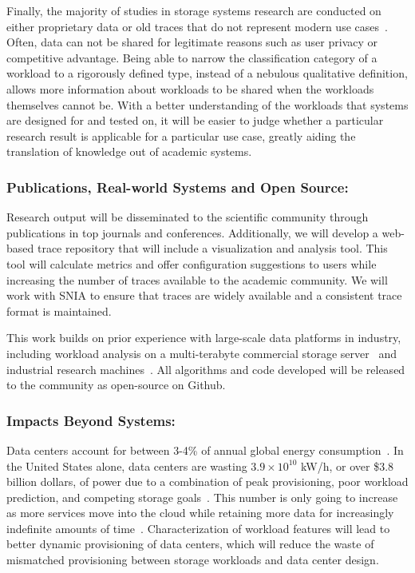 Finally, the majority of studies in storage systems research are conducted on
either proprietary data or old traces that do not represent modern use
cases~\cite{avani-systor}.  Often, data can not be shared for legitimate reasons such as
user privacy or competitive advantage.  Being able to narrow the classification
category of a workload to a rigorously defined type, instead of a nebulous
qualitative definition, allows more information about workloads to be shared
when the workloads themselves cannot be.
With a better understanding of the workloads that systems are designed for and
tested on, it will be easier to judge whether a particular research result is
applicable for a particular use case, greatly aiding the translation of
knowledge out of academic systems.

\subsubsection*{Publications, Real-world Systems and Open Source: } 

Research output will be disseminated to the scientific community through
publications in top journals and conferences.  Additionally, we will develop a
web-based trace repository that will include a visualization and analysis tool. This tool will calculate metrics and
offer configuration suggestions to users while increasing the number
of traces available to the academic community.  We will work with SNIA to ensure that traces are widely available and a consistent trace format is maintained.

This work builds on prior experience with large-scale data platforms in industry, including workload
analysis on a multi-terabyte commercial storage server~\cite{hands} and
industrial research machines~\cite{avani-systor}.
All algorithms and code developed will be released to the community as
open-source on Github.%

\subsubsection*{Impacts Beyond Systems: }

Data centers account for between 3-4\% of annual global energy
consumption~\cite{nrdc}.  In the United States alone, data centers are wasting
$3.9\times10^{10}$ kW/h, or over \$3.8 billion dollars, of power due to a
combination of peak provisioning, poor workload prediction, and competing
storage goals~\cite{masanet,nrdc}.  This number is only going to increase as
more services move into the cloud while retaining more data for increasingly
indefinite amounts of time~\cite{nrdc,baker2006fresh}.  Characterization of workload
features will lead to better dynamic provisioning of data centers, which will
reduce the waste of mismatched provisioning between storage workloads and data
center design.  

